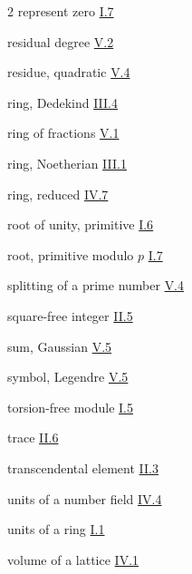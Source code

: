 \begin{multicols}{2}
represent zero \hyperref[sec:1.7]{I.7}

residual degree \hyperref[sec:5.2]{V.2}

residue, quadratic \hyperref[sec:5.4]{V.4}

ring, Dedekind \hyperref[sec:3.4]{III.4}

ring of fractions \hyperref[sec:5.1]{V.1}

ring, Noetherian \hyperref[sec:3.1]{III.1}

ring, reduced \hyperref[sec:4.7]{IV.7}

root of unity, primitive \hyperref[sec:1.6]{I.6}

root, primitive modulo $p$ \hyperref[sec:1.7]{I.7}

\medskip
splitting of a prime number \hyperref[sec:5.4]{V.4}

square-free integer \hyperref[sec:2.5]{II.5}

sum, Gaussian \hyperref[sec:5.5]{V.5}

symbol, Legendre \hyperref[sec:5.5]{V.5}

\medskip
torsion-free module \hyperref[sec:1.5]{I.5}

trace \hyperref[sec:2.6]{II.6}

transcendental element \hyperref[sec:2.3]{II.3}

\medskip
units of a number field \hyperref[sec:4.4]{IV.4}

units of a ring \hyperref[sec:1.1]{I.1}

\medskip
volume of a lattice \hyperref[sec:4.1]{IV.1}

\end{multicols}
